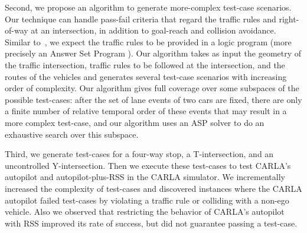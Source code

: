 Second, we propose an algorithm to generate more-complex test-case scenarios.
%
Our technique can handle pass-fail criteria that regard the traffic rules and right-of-way at an intersection, in addition to goal-reach and collision avoidance.
%
Similar to~\cite{Karimi.2020}, we expect the traffic rules to be provided in a logic program (more precisely an Answer Set Program \cite{Lifschitz.2010}).
%
Our algorithm takes as input the geometry of the traffic intersection, traffic rules to be followed at the intersection, and the routes of the vehicles and generates several test-case scenarios with increasing order of complexity.
%
Our algorithm gives full coverage over some subspaces of the possible test-cases: after the set of lane events of two cars are fixed, there are only a finite number of relative temporal order of these events that may result in a more complex test-case, and our algorithm uses an ASP solver to do an exhaustive search over this subspace.


Third, we generate test-cases for a four-way stop, a T-intersection, and an uncontrolled Y-intersection.
%
Then we execute these test-cases to test CARLA's autopilot and autopilot-plus-RSS in the CARLA simulator.
%
We incrementally increased the complexity of test-cases and discovered instances where the CARLA autopilot failed test-cases by violating a traffic rule or colliding with a non-ego vehicle.
%
Also we observed that restricting the behavior of CARLA's autopilot with RSS improved its rate of success, but did not guarantee passing a test-case.



